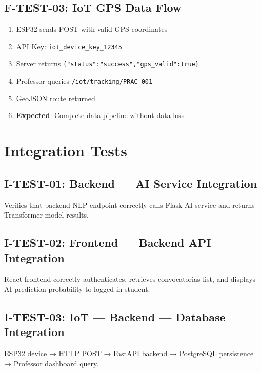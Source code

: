 \documentclass[12pt,a4paper]{report}
\begin{document}
\subsection{F-TEST-03: IoT GPS Data Flow}
\begin{enumerate}
    \item ESP32 sends POST with valid GPS coordinates
    \item API Key: \texttt{iot\_device\_key\_12345}
    \item Server returns \texttt{\{"status":"success","gps\_valid":true\}}
    \item Professor queries \texttt{/iot/tracking/PRAC\_001}
    \item GeoJSON route returned
    \item \textbf{Expected}: Complete data pipeline without data loss
\end{enumerate}

\section{Integration Tests}

\subsection{I-TEST-01: Backend — AI Service Integration}
Verifies that backend NLP endpoint correctly calls Flask AI service and returns Transformer model results.

\subsection{I-TEST-02: Frontend — Backend API Integration}
React frontend correctly authenticates, retrieves convocatorias list, and displays AI prediction probability to logged-in student.

\subsection{I-TEST-03: IoT — Backend — Database Integration}
ESP32 device → HTTP POST → FastAPI backend → PostgreSQL persistence → Professor dashboard query.
\end{document}
